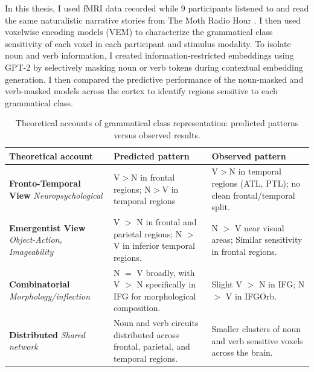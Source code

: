 \documentclass[a4paper]{article}
\begin{document}
In this thesis, I used fMRI data recorded while 9 participants listened to and read the same naturalistic narrative stories from The Moth Radio Hour \parencite{deniz_representation_2019}. I then used voxelwise encoding models (VEM) to characterize the grammatical class sensitivity of each voxel in each participant and stimulus modality. To isolate noun and verb information, I created information-restricted embeddings using GPT-2 by selectively masking noun or verb tokens during contextual embedding generation. I then compared the predictive performance of the noun-masked and verb-masked models across the cortex to identify regions sensitive to each grammatical class.

\begin{table}[ht]
\centering
\caption{Theoretical accounts of grammatical class representation: predicted patterns versus observed results.}
\label{tab:theoretical_accounts}
\small
\begin{tabularx}{\textwidth}{@{} X X X @{}}
\toprule
\textbf{Theoretical account} & \textbf{Predicted pattern} & \textbf{Observed pattern} \\
\midrule

\textbf{Fronto-Temporal View} \newline
\textit{\footnotesize Neuropsychological}\newline
\parencite{damasio_nouns_1993}
&
V$>$N in frontal regions; N$>$V in temporal regions
&
V$>$N in temporal regions (ATL, PTL); no clean frontal/temporal split. \\

\addlinespace

\textbf{Emergentist View} \newline
\textit{\footnotesize Object-Action, Imageability}\newline
\parencite{bird_why_2000,vigliocco_nouns_2011}
&
V $>$ N in frontal and parietal regions; N $>$ V in inferior temporal regions.
&
N $>$ V near visual areas; Similar sensitivity in frontal regions. \\

\addlinespace

\textbf{Combinatorial} \newline
\textit{\footnotesize Morphology/inflection}\newline
\parencite{tyler_neural_2004,shapiro_dissociating_2005}
&
N $=$ V broadly, with V $>$ N specifically in IFG for morphological composition.
&
Slight V $>$ N in IFG; N $>$ V in IFGOrb. \\

\addlinespace

\textbf{Distributed} \newline
\textit{\footnotesize Shared network}\newline
\parencite{crepaldi_clustering_2013,caucheteux_disentangling_2021}
&
Noun and verb circuits distributed across frontal, parietal, and temporal regions.
&
Smaller clusters of noun and verb sensitive voxels across the brain. \\

\bottomrule
\end{tabularx}
\end{table}
\end{document}
